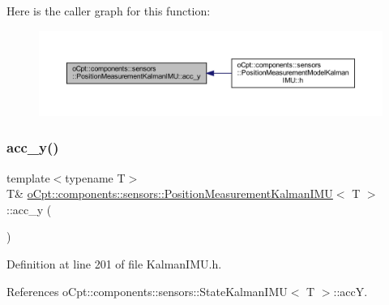 Here is the caller graph for this function\+:
\nopagebreak
\begin{figure}[H]
\begin{center}
\leavevmode
\includegraphics[width=350pt]{classo_cpt_1_1components_1_1sensors_1_1_position_measurement_kalman_i_m_u_abbd04b0e58d5041e2f69f79ccdd09b69_icgraph}
\end{center}
\end{figure}
\hypertarget{classo_cpt_1_1components_1_1sensors_1_1_position_measurement_kalman_i_m_u_abbc0b3a7bebedbf7fcd4caad7cd57694}{}\label{classo_cpt_1_1components_1_1sensors_1_1_position_measurement_kalman_i_m_u_abbc0b3a7bebedbf7fcd4caad7cd57694} 
\subsubsection{\texorpdfstring{acc\+\_\+y()}{acc\_y()}\hspace{0.1cm}{\footnotesize\ttfamily [2/2]}}
{\footnotesize\ttfamily template$<$typename T$>$ \\
T\& \hyperlink{classo_cpt_1_1components_1_1sensors_1_1_position_measurement_kalman_i_m_u}{o\+Cpt\+::components\+::sensors\+::\+Position\+Measurement\+Kalman\+I\+MU}$<$ T $>$\+::acc\+\_\+y (\begin{DoxyParamCaption}{ }\end{DoxyParamCaption})\hspace{0.3cm}{\ttfamily [inline]}}



Definition at line 201 of file Kalman\+I\+M\+U.\+h.



References o\+Cpt\+::components\+::sensors\+::\+State\+Kalman\+I\+M\+U$<$ T $>$\+::accY.

\hypertarget{classo_cpt_1_1components_1_1sensors_1_1_position_measurement_kalman_i_m_u_a63dd831aac6136f1e55b373b3b7046c1}{}\label{classo_cpt_1_1components_1_1sensors_1_1_position_measurement_kalman_i_m_u_a63dd831aac6136f1e55b373b3b7046c1} 
